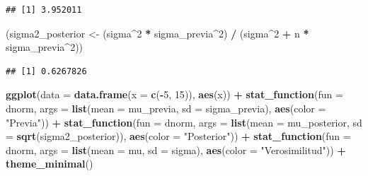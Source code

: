 \documentclass[
  12pt,
]{book}
\newenvironment{Shaded}{\begin{snugshade}}{\end{snugshade}}
\newcommand{\DataTypeTok}[1]{\textcolor[rgb]{0.13,0.29,0.53}{#1}}
\newcommand{\DecValTok}[1]{\textcolor[rgb]{0.00,0.00,0.81}{#1}}
\newcommand{\KeywordTok}[1]{\textcolor[rgb]{0.13,0.29,0.53}{\textbf{#1}}}
\newcommand{\NormalTok}[1]{#1}
\newcommand{\OperatorTok}[1]{\textcolor[rgb]{0.81,0.36,0.00}{\textbf{#1}}}
\newcommand{\StringTok}[1]{\textcolor[rgb]{0.31,0.60,0.02}{#1}}
\begin{document}
\begin{verbatim}
## [1] 3.952011
\end{verbatim}

\begin{Shaded}
\begin{Highlighting}[]
\NormalTok{(sigma2\_posterior \textless{}{-}}\StringTok{ }\NormalTok{(sigma}\OperatorTok{\^{}}\DecValTok{2} \OperatorTok{*}\StringTok{ }\NormalTok{sigma\_previa}\OperatorTok{\^{}}\DecValTok{2}\NormalTok{) }\OperatorTok{/}\StringTok{ }\NormalTok{(sigma}\OperatorTok{\^{}}\DecValTok{2} \OperatorTok{+}\StringTok{ }\NormalTok{n }\OperatorTok{*}\StringTok{ }\NormalTok{sigma\_previa}\OperatorTok{\^{}}\DecValTok{2}\NormalTok{))}
\end{Highlighting}
\end{Shaded}

\begin{verbatim}
## [1] 0.6267826
\end{verbatim}

\begin{Shaded}
\begin{Highlighting}[]
\KeywordTok{ggplot}\NormalTok{(}\DataTypeTok{data =} \KeywordTok{data.frame}\NormalTok{(}\DataTypeTok{x =} \KeywordTok{c}\NormalTok{(}\OperatorTok{{-}}\DecValTok{5}\NormalTok{, }\DecValTok{15}\NormalTok{)), }\KeywordTok{aes}\NormalTok{(x)) }\OperatorTok{+}
\StringTok{  }\KeywordTok{stat\_function}\NormalTok{(}\DataTypeTok{fun =}\NormalTok{ dnorm, }\DataTypeTok{args =} \KeywordTok{list}\NormalTok{(}\DataTypeTok{mean =}\NormalTok{ mu\_previa, }\DataTypeTok{sd =}\NormalTok{ sigma\_previa), }\KeywordTok{aes}\NormalTok{(}\DataTypeTok{color =} \StringTok{"Previa"}\NormalTok{)) }\OperatorTok{+}
\StringTok{  }\KeywordTok{stat\_function}\NormalTok{(}\DataTypeTok{fun =}\NormalTok{ dnorm, }\DataTypeTok{args =} \KeywordTok{list}\NormalTok{(}\DataTypeTok{mean =}\NormalTok{ mu\_posterior, }\DataTypeTok{sd =} \KeywordTok{sqrt}\NormalTok{(sigma2\_posterior)), }\KeywordTok{aes}\NormalTok{(}\DataTypeTok{color =} \StringTok{"Posterior"}\NormalTok{)) }\OperatorTok{+}
\StringTok{  }\KeywordTok{stat\_function}\NormalTok{(}\DataTypeTok{fun =}\NormalTok{ dnorm, }\DataTypeTok{args =} \KeywordTok{list}\NormalTok{(}\DataTypeTok{mean =}\NormalTok{ mu, }\DataTypeTok{sd =}\NormalTok{ sigma), }\KeywordTok{aes}\NormalTok{(}\DataTypeTok{color =} \StringTok{"Verosimilitud"}\NormalTok{)) }\OperatorTok{+}
\StringTok{  }\KeywordTok{theme\_minimal}\NormalTok{()}
\end{Highlighting}
\end{Shaded}
\end{document}
